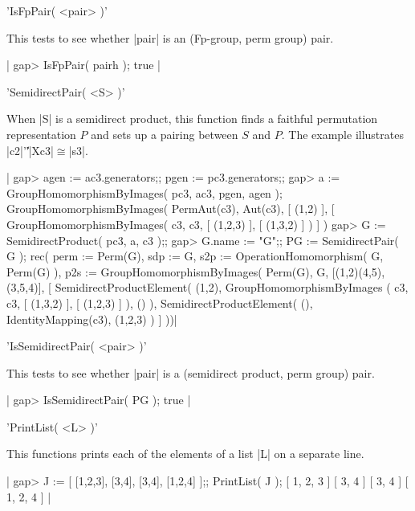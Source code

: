 {%
%

'IsFpPair( <pair> )'

This tests to see whether |pair| is an (Fp-group, perm group) pair.

|    gap> IsFpPair( pairh );
    true |

%

'SemidirectPair( <S> )'

When |S| is a semidirect product, this function finds a faithful
permutation representation $P$ and sets up a pairing between $S$ and $P$.
The example illustrates  |c2|'\|'|Xc3|$\cong$|s3|.

|    gap> agen := ac3.generators;; pgen := pc3.generators;;
    gap> a := GroupHomomorphismByImages( pc3, ac3, pgen, agen );
    GroupHomomorphismByImages( PermAut(c3), Aut(c3), [ (1,2) ], 
    [ GroupHomomorphismByImages( c3, c3, [ (1,2,3) ], [ (1,3,2) ] ) ] )
    gap> G := SemidirectProduct( pc3, a, c3 );;
    gap> G.name := "G";;  PG := SemidirectPair( G );
    rec(
      perm := Perm(G),
      sdp := G,
      s2p := OperationHomomorphism( G, Perm(G) ),
      p2s := GroupHomomorphismByImages( Perm(G), G, [(1,2)(4,5), (3,5,4)],
        [ SemidirectProductElement( (1,2), GroupHomomorphismByImages
              ( c3, c3, [ (1,3,2) ], [ (1,2,3) ] ), () ), 
        SemidirectProductElement( (), IdentityMapping(c3), (1,2,3) ) ] ))|

%

'IsSemidirectPair( <pair> )'

This tests to see whether |pair| is a (semidirect product, perm group) pair.

|    gap> IsSemidirectPair( PG );
    true |

%

'PrintList( <L> )'

This functions prints each of the elements of a list |L|
on a separate line.

|    gap> J := [ [1,2,3], [3,4], [3,4], [1,2,4] ];; PrintList( J );
    [ 1, 2, 3 ]
    [ 3, 4 ]
    [ 3, 4 ]
    [ 1, 2, 4 ]  |

}
